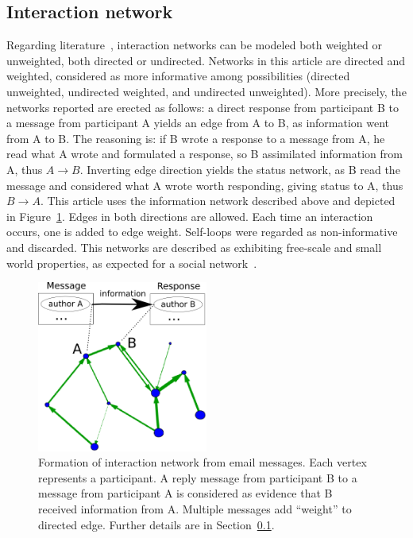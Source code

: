 \documentclass[%
 aip,
 jmp,%
 amsmath,amssymb,
 reprint,%
]{revtex4-1}
\begin{document}
    \subsection{Interaction network}\label{intNet}
Regarding literature~\cite{bird,newmanCommunityDirected,newmanCommunity2013}, interaction networks can be modeled both weighted or unweighted, both directed or undirected. Networks in this article are directed and weighted, considered as more informative among possibilities (directed unweighted, undirected weighted, and undirected unweighted).
More precisely, the networks reported are erected as follows: a direct response from participant B to a message from participant A yields an edge from A to B, as information went from A to B. The reasoning is: if B wrote a response to a message from A, he read what A wrote and formulated a response, so B assimilated information from A, thus $A \rightarrow B$. Inverting edge direction yields the status network, as B read the message and considered what A wrote worth responding, giving status to A, thus $B\rightarrow A$. This article uses the information network described above and depicted in Figure~\ref{formationNetwork}. Edges in both directions are allowed. Each time an interaction occurs, one is added to edge weight. Self-loops were regarded as non-informative and discarded. This networks are described as exhibiting free-scale and small world properties, as expected for a social network~\cite{bird}.

\begin{figure}[hb]
    \centering
    \includegraphics[width=0.5\textwidth]{figs/criaRede_}
    \caption{Formation of interaction network from email messages. Each vertex represents a participant. A reply message from participant B to a message from participant A is considered as evidence that B received information from A. Multiple messages add ``weight'' to directed edge. Further details are in Section~\ref{intNet}.}
    \label{formationNetwork}
\end{figure}
\end{document}
